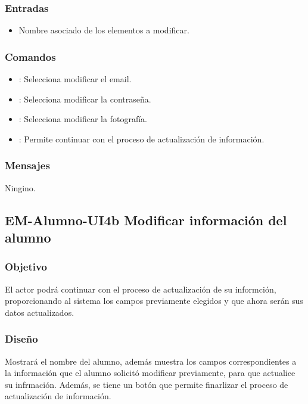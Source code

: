 \subsubsection{Entradas}
\begin{itemize}
	\item Nombre asociado de los elementos a modificar.
\end{itemize}

\subsubsection{Comandos}
\begin{itemize}
	\item {}: Selecciona modificar el email.
	\item {}: Selecciona modificar la contraseña.
	\item {}: Selecciona modificar la fotografía.
	\item {}: Permite continuar con el proceso de actualización de información.
\end{itemize}

\subsubsection{Mensajes}
\begin{Citemize}
	\item Ningino.
\end{Citemize}


\pagebreak
\subsection{EM-Alumno-UI4b Modificar información del alumno}

\subsubsection{Objetivo}
	El actor podrá continuar con el proceso de actualización de su informción, proporcionando al sistema los campos previamente elegidos y que ahora serán sus datos actualizados. 

\subsubsection{Diseño}
	Mostrará el nombre del alumno, además muestra los campos correspondientes a la información que el alumno solicitó modificar previamente, para que actualice su infrmación. Además, se tiene un botón  que permite finarlizar el proceso de actualización de información.


